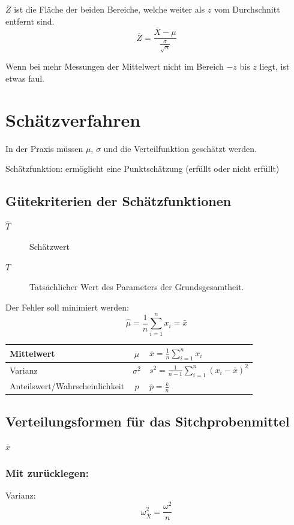 $\overline{Z}$ ist die Fläche der beiden Bereiche, welche weiter als $z$ vom Durchschnitt entfernt sind.
\[
\overline{Z} = \frac{\bar{X}-\mu}{\frac{\sigma}{\sqrt{n}}}
\]

Wenn bei mehr Messungen der Mittelwert nicht im Bereich $-z$ bis $z$ liegt, ist etwas faul.

\section{Schätzverfahren}

In der Praxis müssen $\mu$, $\sigma$ und die Verteilfunktion geschätzt werden.

Schätzfunktion: ermöglicht eine Punktschätzung (erfüllt oder nicht erfüllt)

\subsection{Gütekriterien der Schätzfunktionen}

\begin{description}
	\item[$\hat{T}$] Schätzwert
	\item[$T$] Tatsächlicher Wert des Parameters der Grundsgesamtheit.
\end{description}

Der Fehler soll minimiert werden:
\[
\hat\mu = \frac{1}{n} \sum^n_{i=1}{x_i} = \bar{x}
\]


\begin{tabu}{ l | c | X}
Mittelwert & $\mu$ & $ \bar{x} = \frac{1}{n} \sum^n_{i=1}{x_i} $ \\
\hline
Varianz & $\sigma^2$ & $ s^2 = \frac{1}{n-1} \sum^n_{i=1}{(x_i - \bar{x})^2} $ \\
\hline
Anteilswert/Wahrscheinlichkeit & $p$ & $ \bar{p} = \frac{k}{n} $ \\
\end{tabu}

\subsection{Verteilungsformen für das Sitchprobenmittel}

$\overline{x}$

\subsubsection{Mit zurücklegen:}
	Varianz:
\[
	\omega_{\overline{X}}^{2} = \frac{\omega^2}{n}
\]
	
